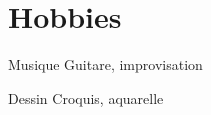 \documentclass{tccv}
\begin{document}
\section{Hobbies}

\begin{factlist}

\item{Musique}
     {Guitare, improvisation}

\item{Dessin}
     {Croquis, aquarelle}

\end{factlist}
\end{document}
